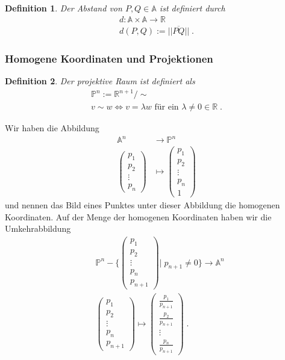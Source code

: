\documentclass[]{article}
\newtheorem{Definition}{Definition}
\begin{document}
\begin{Definition}
Der Abstand von  $P,Q \in \mathbb{A}$  ist definiert durch
\begin{align*}
d : \mathbb{A} \times \mathbb{A} \to \mathbb{R} \\
d(P,Q) := || \overline{PQ} || \; .
\end{align*}
\end{Definition}


\subsubsection{Homogene Koordinaten und Projektionen}

\begin{Definition}
Der projektive  Raum ist definiert als
\begin{align*}
\mathbb{P}^n := \mathbb{R}^{n+1} / \sim \\
v \sim w \Leftrightarrow v = \lambda w \text{ für ein } \lambda \neq 0 \in \mathbb{R} \; . 
\end{align*}
\end{Definition}

Wir haben die Abbildung
\begin{align*}
\mathbb{A}^n & \to \mathbb{P}^n \\
\begin{pmatrix} p_1 \\ p_2 \\ \vdots \\ p_n \end{pmatrix} & \mapsto \begin{pmatrix} p_1 \\ p_2 \\ \vdots \\ p_n  \\  1\end{pmatrix} 
\end{align*}
und nennen das Bild eines Punktes unter dieser Abbildung die homogenen Koordinaten.
Auf der Menge der homogenen Koordinaten haben wir die Umkehrabbildung
\begin{align*}
& \mathbb{P}^n - \Biggl \{ \begin{pmatrix} p_1 \\ p_2 \\ \vdots \\ p_n  \\  p_{n+1} \end{pmatrix} \Bigg | \; p_{n+1} \neq 0 \Biggr \}   \to \mathbb{A}^n \\
& \begin{pmatrix} p_1 \\ p_2 \\ \vdots \\ p_n  \\  p_{n+1} \end{pmatrix}   \mapsto \begin{pmatrix}  \frac{p_1}{ p_{n+1}} \\ \frac{p_2}{ p_{n+1}}  \\ \vdots \\ \frac{p_n}{ p_{n+1}}  \end{pmatrix}  \; .
\end{align*}
\end{document}
